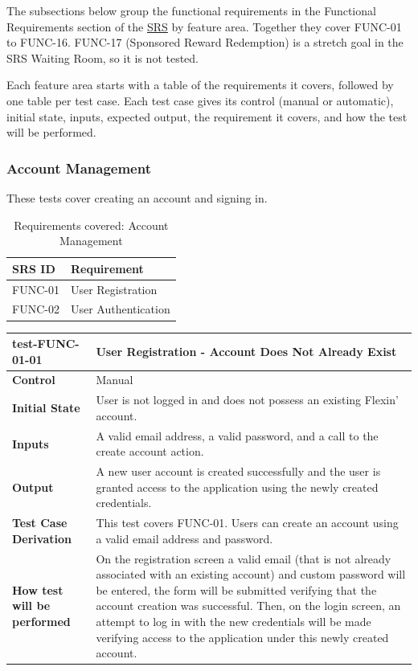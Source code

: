 \documentclass[12pt, titlepage]{article}
\begin{document}
The subsections below group the functional requirements in the Functional Requirements section of the
\href{https://github.com/arjunkarthik123/fitness-finance-application/blob/main/pdfs/SRS-Volere/SRS.pdf}{SRS} by feature area. Together they cover FUNC-01 to FUNC-16.
FUNC-17 (Sponsored Reward Redemption) is a stretch goal in the SRS Waiting
Room, so it is not tested.

Each feature area starts with a table of the requirements it covers, followed
by one table per test case. Each test case gives its control (manual or
automatic), initial state, inputs, expected output, the requirement it covers,
and how the test will be performed.

\subsubsection{Account Management}

These tests cover creating an account and signing in.

\begin{table}[H]
  \caption{Requirements covered: Account Management}
  \noindent\begin{tabularx}{\textwidth}{p{3cm}X}
  \toprule
  \textbf{SRS ID} & \textbf{Requirement} \\
  \midrule
  FUNC-01 & User Registration \\
  FUNC-02 & User Authentication \\
  \bottomrule
\end{tabularx}
\end{table}

\vspace{1em}

\noindent\begin{tabularx}{\textwidth}{>{\raggedright\arraybackslash}p{3.5cm}X}
  \toprule
  \textbf{test-FUNC-01-01} & \textbf{User Registration - Account Does Not Already Exist}\\
  \midrule
  \textbf{Control} & Manual\\
  \textbf{Initial State} & User is not logged in and does not possess an existing Flexin' account.\\
  \textbf{Inputs} & A valid email address, a valid password, and a call to the create account action.\\
  \textbf{Output} & A new user account is created successfully and the user is granted access to the application using the newly created credentials.\\
  \textbf{Test Case Derivation} & This test covers FUNC-01. Users can create an account using a valid email address and password.\\
  \textbf{How test will be performed} & On the registration screen a valid email (that is not already associated with an existing account) and custom password will be entered, the form will be submitted verifying that the account creation was successful. Then, on the login screen, an attempt to log in with the new credentials will be made verifying access to the application under this newly created account.\\
  \bottomrule
\end{tabularx}
\end{document}
